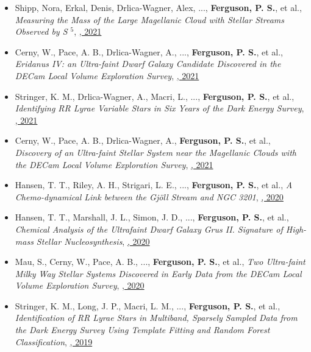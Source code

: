 \begin{itemize}[itemsep=1pt]
    \item {Shipp}, Nora, {Erkal}, Denis, {Drlica-Wagner}, Alex, ..., \textbf{Ferguson, P. S.}, et al., \textit{{Measuring the Mass of the Large Magellanic Cloud with Stellar Streams Observed by S $^{5}$}}, \href{https://ui.adsabs.harvard.edu/abs/2021ApJ...923..149S}{\textbf{\apj}, 2021}
    \item {Cerny}, W., {Pace}, A. B., {Drlica-Wagner}, A., ..., \textbf{Ferguson, P. S.}, et al., \textit{{Eridanus IV: an Ultra-faint Dwarf Galaxy Candidate Discovered in the DECam Local Volume Exploration Survey}}, \href{https://ui.adsabs.harvard.edu/abs/2021ApJ...920L..44C}{\textbf{\apjl}, 2021}
    \item {Stringer}, K. M., {Drlica-Wagner}, A., {Macri}, L., ..., \textbf{Ferguson, P. S.}, et al., \textit{{Identifying RR Lyrae Variable Stars in Six Years of the Dark Energy Survey}}, \href{https://ui.adsabs.harvard.edu/abs/2021ApJ...911..109S}{\textbf{\apj}, 2021}
    \item {Cerny}, W., {Pace}, A. B., {Drlica-Wagner}, A., \textbf{Ferguson, P. S.}, et al., \textit{{Discovery of an Ultra-faint Stellar System near the Magellanic Clouds with the DECam Local Volume Exploration Survey}}, \href{https://ui.adsabs.harvard.edu/abs/2021ApJ...910...18C}{\textbf{\apj}, 2021}
    \item {Hansen}, T. T., {Riley}, A. H., {Strigari}, L. E., ..., \textbf{Ferguson, P. S.}, et al., \textit{{A Chemo-dynamical Link between the Gj{\"o}ll Stream and NGC 3201}}, \href{https://ui.adsabs.harvard.edu/abs/2020ApJ...901...23H}{\textbf{\apj}, 2020}
    \item {Hansen}, T. T., {Marshall}, J. L., {Simon}, J. D., ..., \textbf{Ferguson, P. S.}, et al., \textit{{Chemical Analysis of the Ultrafaint Dwarf Galaxy Grus II. Signature of High-mass Stellar Nucleosynthesis}}, \href{https://ui.adsabs.harvard.edu/abs/2020ApJ...897..183H}{\textbf{\apj}, 2020}
    \item {Mau}, S., {Cerny}, W., {Pace}, A. B., ..., \textbf{Ferguson, P. S.}, et al., \textit{{Two Ultra-faint Milky Way Stellar Systems Discovered in Early Data from the DECam Local Volume Exploration Survey}}, \href{https://ui.adsabs.harvard.edu/abs/2020ApJ...890..136M}{\textbf{\apj}, 2020}
    \item {Stringer}, K. M., {Long}, J. P., {Macri}, L. M., ..., \textbf{Ferguson, P. S.}, et al., \textit{{Identification of RR Lyrae Stars in Multiband, Sparsely Sampled Data from the Dark Energy Survey Using Template Fitting and Random Forest Classification}}, \href{https://ui.adsabs.harvard.edu/abs/2019AJ....158...16S}{\textbf{\aj}, 2019}
\end{itemize}
